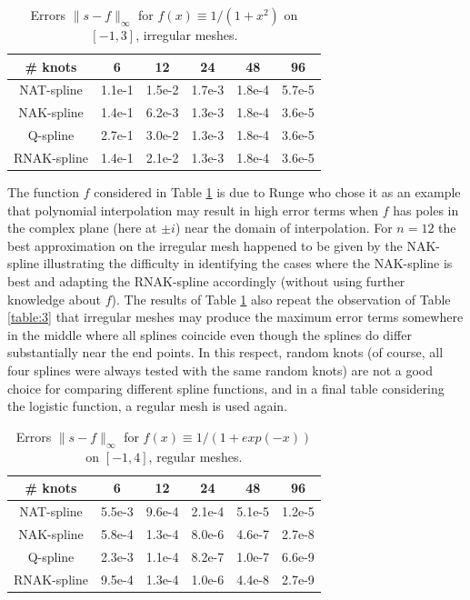 \documentclass[12pt]{article}
\begin{document}
\vfill


\begin{table}[!h]
\centering
\begin{tabular}{| c| c| c| c| c| c|} 
 \hline
 \# knots & 6 & 12 & 24 & 48 & 96 \\ [0.5ex] 
 \hline\hline
 NAT-spline & 1.1e-1 & 1.5e-2 & 1.7e-3 & 1.8e-4 & 5.7e-5  \\
 NAK-spline & 1.4e-1 & 6.2e-3 & 1.3e-3 & 1.8e-4 & 3.6e-5  \\
 Q-spline   & 2.7e-1 & 3.0e-2 & 1.3e-3 & 1.8e-4 & 3.6e-5  \\
 RNAK-spline& 1.4e-1 & 2.1e-2 & 1.3e-3 & 1.8e-4 & 3.6e-5  \\
\hline
\end{tabular}
\caption{Errors $\|s-f \|_\infty$ for $f(x)\equiv 1/(1+x^2)$ on $[-1,3]$, irregular meshes.}
\label{table:4}
\end{table}


The function $f$ considered in Table \ref{table:4} is due to Runge \cite{Runge}
who chose it as an example that polynomial interpolation
may result in high error terms when $f$ has poles
in the complex plane (here at $\pm i$) near the domain of interpolation. 
For $n=12$ the best approximation on the irregular mesh happened to
be given by the NAK-spline illustrating the difficulty in identifying
the cases where the NAK-spline is best and adapting the RNAK-spline
accordingly (without using further knowledge about $f$).
The results of Table \ref{table:4} also
repeat the observation of Table \ref{table:3}
that irregular meshes may produce the maximum error terms
somewhere in the middle where all splines coincide even though
the splines do differ substantially near the end points.
In this respect, random knots
(of course, all four splines were always tested with the same random knots)
are not a good choice for comparing
different spline functions, and
in a final table considering the logistic function, a regular mesh is
used again.





\begin{table}[!h]
\centering
\begin{tabular}{| c| c| c| c| c| c|} 
 \hline
 \# knots & 6 & 12 & 24 & 48 & 96 \\ [0.5ex] 
 \hline\hline
 NAT-spline & 5.5e-3 & 9.6e-4 & 2.1e-4 & 5.1e-5 & 1.2e-5  \\
 NAK-spline & 5.8e-4 & 1.3e-4 & 8.0e-6 & 4.6e-7 & 2.7e-8  \\
 Q-spline   & 2.3e-3 & 1.1e-4 & 8.2e-7 & 1.0e-7 & 6.6e-9  \\
 RNAK-spline& 9.5e-4 & 1.3e-4 & 1.0e-6 & 4.4e-8 & 2.7e-9  \\
\hline
\end{tabular}
\caption{Errors $\|s-f \|_\infty$ for $f(x)\equiv 1/(1+exp(-x))$ on $[-1,4]$, regular meshes.}
\label{table:5}
\end{table}
\end{document}
